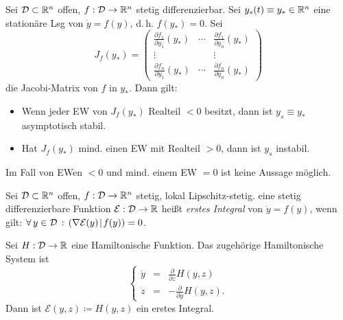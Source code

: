 \documentclass{cheat-sheet}
\newcommand{\D}{\mathcal{D}}
\newcommand{\E}{\mathcal{E}}
\newcommand{\scp}[2]{\left( #1 \!\mid\! #2 \right)} %
\begin{document}
\begin{satz}
  Sei $\D \subset \R^n$ offen, $f : \D \to \R^n$ stetig differenzierbar. Sei $y_s(t) \equiv y_{*} \in \mathbb{R}^n$ eine stationäre Lsg von $\dot{y} = f(y)$, d.\,h. $f(y_{*}) = 0$. Sei
  \[
    J_f(y_{*}) = \begin{pmatrix}
      \frac{\partial f_1}{\partial y_1}(y_{*}) & \cdots & \frac{\partial f_1}{\partial y_n} (y_{*}) \\
      \vdots & & \vdots \\
      \frac{\partial f_n}{\partial y_1} (y_{*}) & \cdots & \frac{\partial f_n}{\partial y_n} (y_{*})
    \end{pmatrix}
  \]
  die Jacobi-Matrix von $f$ in $y_{*}$. Dann gilt:
  \begin{itemize}
    \item Wenn jeder EW von $J_f(y_{*})$ Realteil $< 0$ besitzt, dann ist $y_s \equiv y_{*}$ asymptotisch stabil.
    \item Hat $J_f(y_{*})$ mind. einen EW mit Realteil $> 0$, dann ist $y_s$ instabil.
  \end{itemize}
\end{satz}


\begin{bem}
  Im Fall von EWen $< 0$ und mind. einem EW $= 0$ ist keine Aussage möglich.
\end{bem}


\begin{defn}
  Sei $\D \subset \R^n$ offen, $f : \D \to \R^n$ stetig, lokal Lipschitz-stetig. eine stetig differenzierbare Funktion $\E : \D \to \R$ heißt \emph{erstes Integral} von $\dot{y} = f(y)$, wenn gilt: $\fa{y \in \D} \scp{\nabla \E(y)}{f(y)} = 0$.
\end{defn}

\begin{bsp}
  Sei $H : \D \to \R$ eine Hamiltonische Funktion. Das zugehörige Hamiltonische System ist
  \[
    \left\{ \begin{array}{lll}
      \dot{y} &= & \tfrac{\partial}{\partial z} H(y, z) \\
      \dot{z} &= & - \tfrac{\partial}{\partial y} H(y, z).
    \end{array} \right.
  \]
  Dann ist $\E(y, z) \coloneqq H(y, z)$ ein erstes Integral.
\end{bsp}
\end{document}
